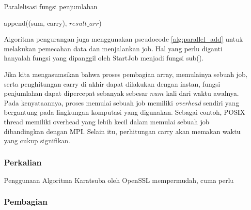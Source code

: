 \begin{algorithm}
  \caption{Paralelisasi fungsi penjumlahan}
  \label{alg:parallel_add}
  \begin{algorithmic}[1]
    \Statex
          \State append((sum, carry), $result\_arr$)
      \EndFor
      \State {}
    \EndFunction
  \end{algorithmic}
\end{algorithm}

Algoritma pengurangan juga menggunakan pseudocode \ref{alg:parallel_add} untuk melakukan pemecahan data dan menjalankan job. Hal yang perlu diganti hanyalah fungsi yang dipanggil oleh StartJob menjadi fungsi sub().

Jika kita mengasumsikan bahwa proses pembagian array, memulainya sebuah job, serta penghitungan carry di akhir dapat dilakukan dengan instan, fungsi penjumlahan dapat dipercepat sebanyak sebesar $num$ kali dari waktu awalnya. Pada kenyataannya, proses memulai sebuah job memiliki \textit{overhead} sendiri yang bergantung pada lingkungan komputasi yang digunakan. Sebagai contoh, POSIX thread memiliki overhead yang lebih kecil dalam memulai sebuah job dibandingkan dengan MPI. Selain itu, perhitungan carry akan memakan waktu yang cukup signifikan.


\subsubsection{Perkalian}

Penggunaan Algoritma Karatsuba oleh OpenSSL mempermudah, cuma perlu

\subsubsection{Pembagian}\label{sec:div_parallel}
